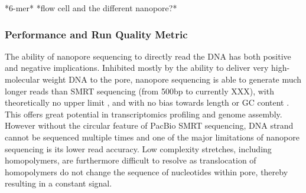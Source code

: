 *6-mer* 
*flow cell and the different nanopore?*

\subsubsection{Performance and Run Quality Metric}
The ability of nanopore sequencing to directly read the DNA has both positive and negative implications. Inhibited mostly by the ability to deliver very high-molecular weight DNA to the pore, nanopore sequencing is able to generate much longer reads than SMRT sequencing (from 500bp to currently XXX), with theoretically no upper limit \cite{Loman2015}, and with no bias towards length or GC content \cite{Oikonomopoulos2016, Weirather2017}. This offers great potential in transcriptomics profiling and genome assembly. However without the circular feature of PacBio SMRT sequencing, DNA strand cannot be sequenced multiple times and one of the major limitations of nanopore sequencing is its lower read accuracy. Low complexity stretches, including homopolymers, are furthermore difficult to resolve as translocation of homopolymers do not change the sequence of nucleotides within pore, thereby resulting in a constant signal. 

